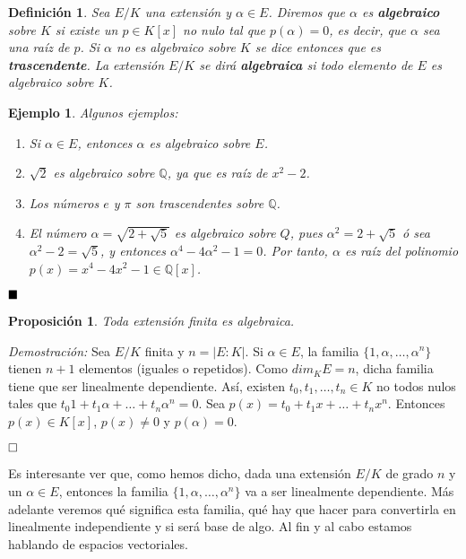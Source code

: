 \documentclass[12pt]{article}
\newtheorem{proposition}[theorem]{Proposición}
\newtheorem{definition}[theorem]{Definición}
\newtheorem{example}{Ejemplo}[theorem]
\begin{document}
\begin{definition} Sea  $E/K$ una extensión y $\alpha \in E$. Diremos que $\alpha$ es \textbf{algebraico} sobre $K$ si existe un $p \in K[x]$ no nulo tal que $p(\alpha) = 0$, es decir, que $\alpha$ sea una raíz de $p$. Si $\alpha$ no es algebraico sobre $K$ se dice entonces que es \textbf{trascendente}. La extensión $E/K$ se dirá \textbf{algebraica} si todo elemento de $E$ es algebraico sobre $K$.
\end{definition}
\begin{example} Algunos ejemplos: \begin{enumerate}
\item Si $\alpha \in E$, entonces $\alpha$ es algebraico sobre $E$.
\item $\sqrt{2}$ es algebraico sobre $\mathbb{Q}$, ya que es raíz de $x^{2}-2$.
\item Los números $e$ y $\pi$ son trascendentes  sobre $\mathbb{Q}$.
\item El número $\alpha = \sqrt{2 + \sqrt{5}}$ es algebraico sobre $Q$, pues $\alpha^{2} = 2 + \sqrt{5}$ ó sea $\alpha^{2}-2 = \sqrt{5}$, y entonces $\alpha^{4}-4\alpha^{2}-1 = 0$. Por tanto, $\alpha$ es raíz del polinomio $p(x) = x^{4}-4x^{2}-1 \in \mathbb{Q}[x]$.
\end{enumerate}
\end{example}

$\hfill \blacksquare$

\begin{proposition} Toda extensión finita es algebraica.
\end{proposition}
\emph{Demostración: } Sea $E/K$ finita y $n = |E:K|$. Si $\alpha \in E$, la familia $\lbrace 1, \alpha, \ldots, \alpha^{n} \rbrace$ tienen $n+1$ elementos (iguales o repetidos). Como $dim_{K} E = n$, dicha familia tiene que ser linealmente dependiente. Así, existen $t_{0}, t_{1}, \ldots, t_{n} \in K$ no todos nulos tales que $t_{0}1 + t_{1}\alpha + \ldots + t_{n}\alpha^{n} = 0$. Sea $p(x) = t_{0} + t_{1}x + \ldots + t_{n}x^{n}$. Entonces $p(x) \in K[x]$, $p(x) \neq 0$ y $p(\alpha) = 0.$

$\hfill \square$

Es interesante ver que, como hemos dicho, dada una extensión $E/K$ de grado $n$ y un $\alpha \in E$, entonces la familia $\lbrace 1, \alpha, \ldots, \alpha^{n} \rbrace$ va a ser linealmente dependiente. Más adelante veremos qué significa esta familia, qué hay que hacer para convertirla en linealmente independiente y si será base de algo. Al fin y al cabo estamos hablando de espacios vectoriales.
\end{document}
